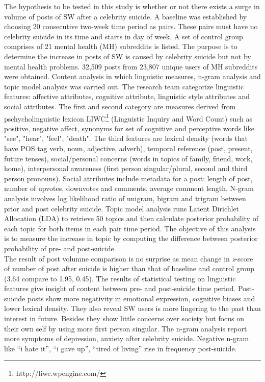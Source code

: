 The hypothesis to be tested in this study is whether or not there exists a surge in volume of posts of SW after a celebrity suicide. A baseline was established by choosing 20 consecutive two-week time period as pairs. These pairs must have no celebrity suicide in its time and starts in day of week. A set of control group comprises of 21 mental health (MH) subreddits is listed. The purpose is to determine the increase in posts of SW is caused by celebrity suicide but not by mental health problems. 32,509 posts from 23,807 unique users of MH subreddits were obtained. Content analysis in which linguistic measures, n-gram analysis and topic model analysis was carried out. The research team categorize linguistic features: affective attributes, cognitive attribute, linguistic style attributes and social attributes. The first and second category are measures derived from pschycholinguistic lexicon LIWC\footnote{http://liwc.wpengine.com/} (Linguistic Inquiry and Word Count) such as positive, negative affect, synonyms for set of cognitive and perceptive words like "see", "hear", "feel", "death". The third features are lexical density (words that have POS tag verb, noun, adjective, adverb), temporal reference (post, present, future tenses), social/personal concerns (words in topics of family, friend, work, home), interpersonal awareness (first person singular/plural, second and third person pronouns). Social attributes include metadata for a post: length of post, number of upvotes, downvotes and comments, average comment length. N-gram analysis involves log likelihood ratio of unigram, bigram and trigram between prior and post celebrity suicide. Topic model analysis runs Latent Dirichlet Allocation (LDA) \cite{Blei2003} to retrieve 50 topics and then calculate posterior probability of each topic for both items in each pair time period. The objective of this analysis is to measure the increase in topic by computing the difference between posterior probability of pre- and post-suicide.\\
The result of post volumne comparison is no surprise as mean change in \textit{z}-score of number of post after suicide is higher than that of baseline and control group (3.64 compare to 1.95, 0.45). The results of statistical testing on linguistic features give insight of content between pre- and post-suicide time period. Post-suicide posts show more negativity in emotional expression, cognitive biases and lower lexical density. They also reveal SW users is more lingering to the past than interest in future. Besides they show little concerns over society but focus on their own self by using more first person singular. The n-gram analysis report more symptoms of depression, anxiety after celebrity suicide. Negative n-gram like “i hate it”, “i gave up”, “tired of living” rise in frequency post-suicide. \\
